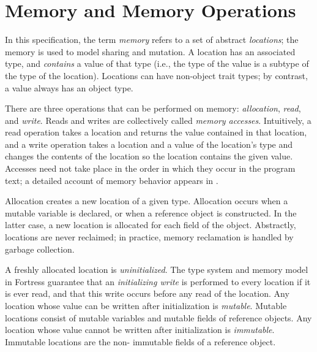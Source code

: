 %
%
%
%

\section{Memory and Memory Operations}


In this specification,
the term \emph{memory} refers to a set of abstract \emph{locations};
the memory is used to model sharing and mutation.
A location has an associated type,
and \emph{contains} a value of that type
(i.e., the type of the value is a subtype of the type of the location).
Locations can have non-object trait types; by contrast, a value always has an object type.

There are three operations that can be performed on memory:
\emph{allocation}, \emph{read}, and \emph{write}.
Reads and writes are collectively called \emph{memory accesses}.
Intuitively,
a read operation takes a location
and returns the value contained in that location,
and a write operation takes a location and a value of the location's type
and changes the contents of the location
so the location contains the given value.
Accesses need not take place in the order in which they occur in the program text; a detailed account of memory behavior appears in .

Allocation creates a new location of a given type.
Allocation occurs when a mutable variable is declared, or when a
reference object is constructed.  In the latter case, a new location
is allocated for each field of the object.
Abstractly, locations are never reclaimed;
in practice, memory reclamation is handled by garbage collection.

A freshly allocated location is \emph{uninitialized}.
The type system and memory model in Fortress guarantee that an
\emph{initializing write} is performed to every location if it is ever read,
and that this write occurs before any read of the location.
Any location whose value can be written after initialization is
\emph{mutable}.  Mutable locations consist of
mutable variables and mutable fields of reference objects.
Any location whose value cannot be written after
initialization is \emph{immutable}.
Immutable locations are the non- immutable fields of a reference object.
